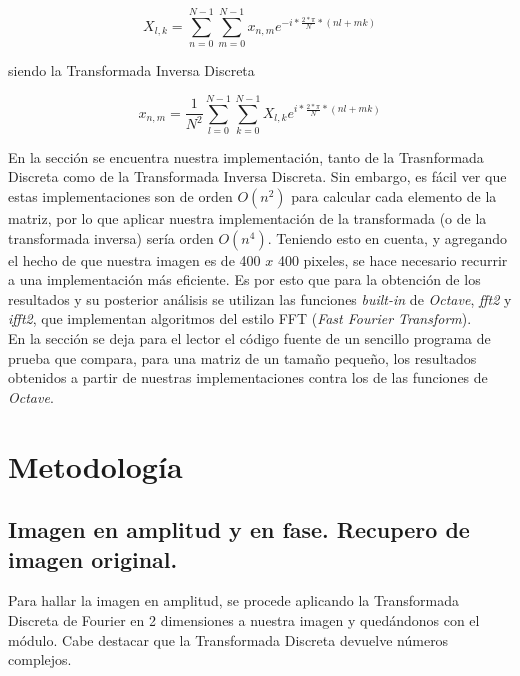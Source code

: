 \documentclass[twocolumn,a4paper,10pt]{article}
\begin{document}
\begin{equation}
    X_{l,k} = \sum_{n=0}^{N - 1} \sum_{m=0}^{N - 1} x_{n,m} e^{-i*\frac{2*\pi}{N}*(nl + mk)}
\end{equation}

siendo la Transformada Inversa Discreta

\begin{equation}
    x_{n,m} = \frac{1}{N^2} \sum_{l=0}^{N - 1} \sum_{k=0}^{N - 1} X_{l,k} e^{i*\frac{2*\pi}{N}*(nl + mk)}
\end{equation}

En la secci\'on 
se encuentra nuestra implementaci\'on, tanto de la Trasnformada Discreta como de la Transformada Inversa Discreta. Sin embargo, es f\'acil ver que estas 
implementaciones son de orden $O(n^2)$ para calcular cada elemento de la matriz, por lo que aplicar nuestra implementaci\'on de la 
transformada (o de la transformada inversa) ser\'ia orden $O(n^4)$. Teniendo esto en cuenta, y agregando el hecho de que nuestra imagen es de 400 $x$ 400 
pixeles, se hace necesario recurrir a una implementaci\'on m\'as eficiente. Es por esto que para la obtenci\'on de los resultados y su posterior an\'alisis 
se utilizan las funciones \textit{built-in} de \textit{Octave}, \textit{fft2} y \textit{ifft2}, que implementan algoritmos del estilo FFT 
(\textit{Fast Fourier Transform}). \\

En la secci\'on 
se deja para el lector el c\'odigo fuente de un sencillo programa de prueba que compara, para una matriz de un tamaño pequeño, los resultados obtenidos a 
partir de nuestras implementaciones contra los de las funciones de \textit{Octave}.\\

\section{Metodolog\'ia}

\subsection{Imagen en amplitud y en fase. Recupero de imagen original.}

Para hallar la imagen en amplitud, se procede aplicando la Transformada Discreta de Fourier en 2 dimensiones a nuestra imagen y qued\'andonos con el 
m\'odulo. Cabe destacar que la Transformada Discreta devuelve n\'umeros complejos. \\
\end{document}
